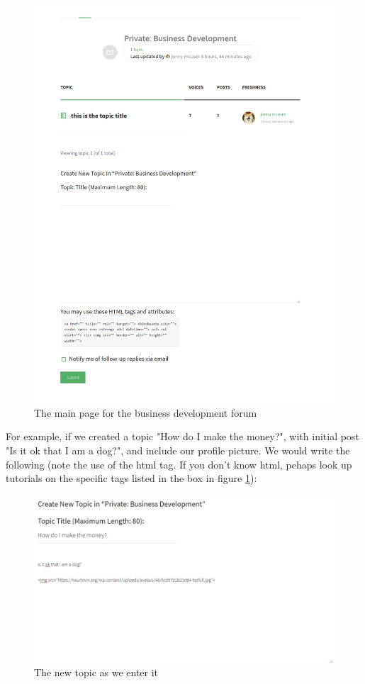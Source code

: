\documentclass[10pt]{article}
\begin{document}
\begin{figure}[H]
    \centering
    \includegraphics[scale=0.3]{images/forummain.jpg}
    \caption{The main page for the business development forum}
    \label{forumpage}
\end{figure}


\begin{flushleft}
For example, if we created a topic "How do I make the money?", with initial post "Is it ok that I am a dog?", and include our profile picture.  We would write the following (note the use of the html tag.  If you don't know html, pehaps look up tutorials on the specific tags listed in the box in figure \ref{forumpage}): 
\end{flushleft}

\begin{figure}[H]
    \centering
    \includegraphics[scale=0.4]{images/newtopic.jpg}
    \caption{The new topic as we enter it}
    \label{newtopic1}
\end{figure}
\end{document}
